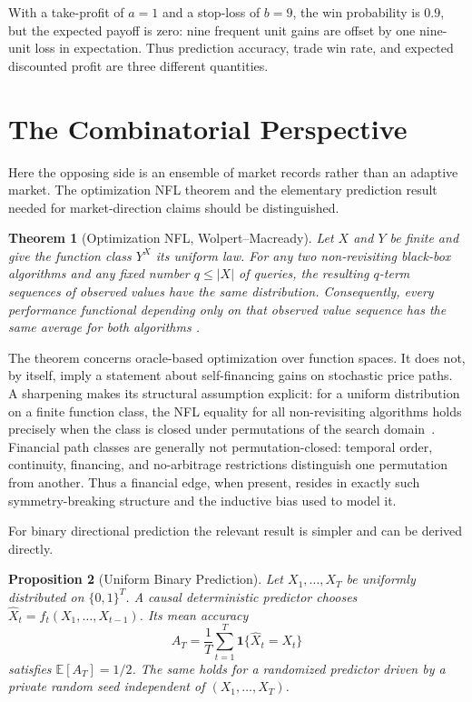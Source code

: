 \documentclass[aps,pra,reprint,superscriptaddress,amsmath,amssymb,floatfix]{revtex4-2}
\theoremstyle{plain}
\newtheorem{theorem}{Theorem}
\newtheorem{proposition}[theorem]{Proposition}
\theoremstyle{definition}
\theoremstyle{remark}
\begin{document}
With a take-profit of \(a=1\) and a stop-loss of \(b=9\), the win probability
is \(0.9\), but the expected payoff is zero: nine frequent unit gains are
offset by one nine-unit loss in expectation. Thus prediction accuracy, trade
win rate, and expected discounted profit are three different quantities.

\section{The Combinatorial Perspective}
\label{sec:nfl}

Here the opposing side is an ensemble of market records rather than an
adaptive market. The optimization NFL theorem and the elementary prediction
result needed for market-direction claims should be distinguished.

\begin{theorem}[Optimization NFL, Wolpert--Macready]
  \label{thm:nfl}
  Let \(X\) and \(Y\) be finite and give the function class \(Y^X\) its uniform
  law. For any two non-revisiting black-box algorithms and any fixed number
  \(q\leq |X|\) of queries, the resulting \(q\)-term sequences of observed
  values have the same distribution. Consequently, every performance
  functional depending only on that observed value sequence has the same
  average for both algorithms
  \cite{Wolpert:1997:NFL:2221336.2221408}.
\end{theorem}

The theorem concerns oracle-based optimization over function spaces. It does
not, by itself, imply a statement about self-financing gains on stochastic
price paths. A sharpening makes its structural assumption explicit: for a
uniform distribution on a finite function class, the NFL equality for all
non-revisiting algorithms holds precisely when the class is closed under
permutations of the search domain~\cite{SchumacherVoseWhitley2001}. Financial
path classes are generally not permutation-closed: temporal order, continuity,
financing, and no-arbitrage restrictions distinguish one permutation from
another. Thus a financial edge, when present, resides in exactly such
symmetry-breaking structure and the inductive bias used to model it.

For binary directional prediction the relevant result is simpler and can be
derived directly.

\begin{proposition}[Uniform Binary Prediction]
  \label{prop:binary}
  Let \(X_1,\ldots,X_T\) be uniformly distributed on \(\{0,1\}^T\). A causal
  deterministic predictor chooses
  \(\widehat X_t=f_t(X_1,\ldots,X_{t-1})\). Its mean accuracy
  \[
    A_T=\frac1T\sum_{t=1}^T
      \mathbf{1}\{\widehat X_t=X_t\}
  \]
  satisfies \(\mathbb{E}[A_T]=1/2\). The same holds for a randomized predictor
  driven by a private random seed independent of
  \((X_1,\ldots,X_T)\).
\end{proposition}
\end{document}
